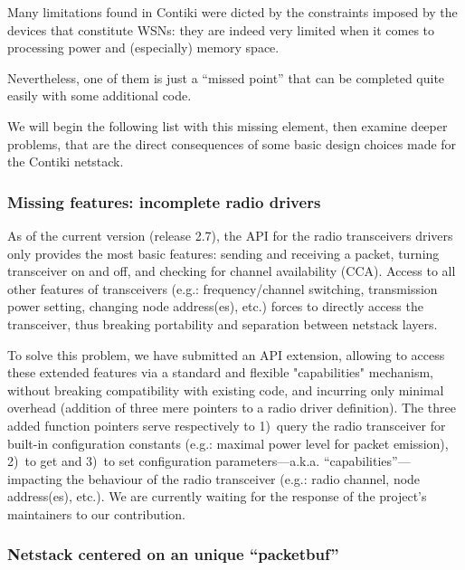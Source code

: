 \documentclass[12pt,twoside,a4paper]{article}
\begin{document}
Many limitations found in Contiki were dicted by the constraints imposed
by the devices that constitute WSNs: they are indeed very limited when
it comes to processing power and (especially) memory space.

Nevertheless, one of them is just a ``missed point'' that can be completed
quite easily with some additional code.

We will begin the following list with this missing element, then examine
deeper problems, that are the direct consequences of some basic design
choices made for the Contiki netstack.


\subsubsection{Missing features: incomplete radio drivers}

As of the current version (release 2.7), the API for the radio transceivers
drivers only provides the most basic features: sending and receiving
a packet, turning transceiver on and off, and checking for channel
availability (CCA). Access to all other features of transceivers (e.g.:
frequency/channel switching, transmission power setting, changing node
address(es), etc.) forces to directly access the transceiver, thus breaking
portability and separation between netstack layers.

To solve this problem, we have submitted an API extension, allowing
to access these extended features via a standard and flexible "capabilities"
mechanism, without breaking compatibility with existing code, and incurring
only minimal overhead (addition of three mere pointers to a radio driver
definition). The three added function pointers serve respectively to
1)~query the radio transceiver for built-in configuration constants
(e.g.: maximal power level for packet emission), 2)~to get and
3)~to set configuration parameters---a.k.a. ``capabilities''---impacting
the behaviour of the radio transceiver (e.g.: radio channel,
node address(es), etc.). We are currently waiting for the
response of the project's maintainers to our contribution.


\subsubsection{Netstack centered on an unique ``packetbuf''}
\end{document}
